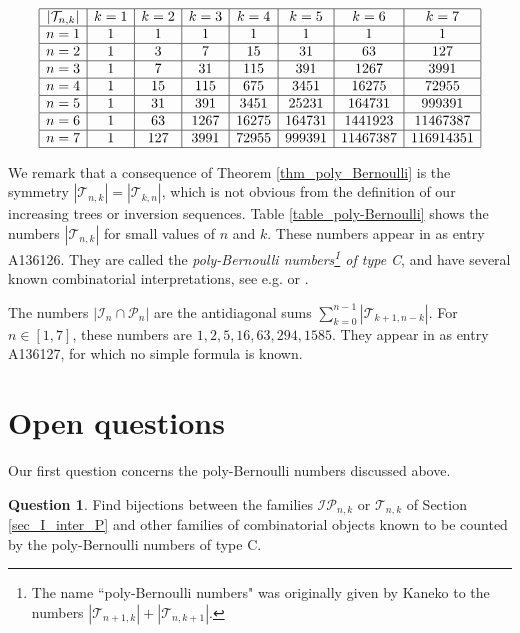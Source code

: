 \documentclass[a4paper,11pt]{article}
\theoremstyle{definition}
\newtheorem{question}{Question}
\theoremstyle{remark}
\newcommand{\I}{\mathcal{I}}
\renewcommand{\P}{\mathcal{P}}
\newcommand{\T}{\mathcal{T}}
\begin{document}
\begin{table}[ht]
$$\begin{array}{|c|c|c|c|c|c|c|c|}
\hline
|\T_{n,k}| & k=1 & k=2 & k=3 & k=4 & k=5 & k=6 & k=7 \\
\hline
n=1 & 1 & 1 & 1 & 1 & 1 & 1 & 1\\
\hline
n=2 & 1 & 3 & 7 & 15 & 31 & 63 & 127 \\
\hline
n=3 & 1 & 7 & 31 & 115 & 391 & 1267 & 3991 \\
\hline
n=4 & 1 & 15 & 115 & 675 & 3451 & 16275 & 72955 \\
\hline
n=5 & 1 & 31 & 391 & 3451 & 25231 & 164731 & 999391  \\
\hline
n=6 & 1 & 63 & 1267 & 16275 & 164731 & 1441923 & 11467387 \\
\hline
n=7 & 1 & 127 & 3991 & 72955 & 999391 & 11467387 & 116914351 \\
\hline
\end{array}$$
\caption{The numbers $|\T_{n,k}|$ for $n,k \in [1,7]$.}
\label{table_poly-Bernoulli}
\end{table}

We remark that a consequence of Theorem \ref{thm_poly_Bernoulli} is the symmetry $|\T_{n,k}| = |\T_{k,n}|$, which is not obvious from the definition of our increasing trees or inversion sequences.
Table \ref{table_poly-Bernoulli} shows the numbers $|\T_{n,k}|$ for small values of $n$ and $k$. These numbers appear in \cite{OEIS} as entry A136126. They are called the \emph{poly-Bernoulli numbers\footnote{The name ``poly-Bernoulli numbers" was originally given by Kaneko \cite{Kaneko_1997} to the numbers $|\T_{n+1,k}| + |\T_{n,k+1}|$.} of type C},
and have several known combinatorial interpretations, see e.g. \cite{Bényi_Hajnal_2017} or \cite{Knuth_2024}.

The numbers $|\I_n \cap \P_n|$ are the antidiagonal sums $\sum_{k = 0}^{n-1} |\T_{k+1,n-k}|$. For $n \in [1,7]$, these numbers are $1, 2, 5, 16, 63, 294, 1585$. They appear in \cite{OEIS} as entry A136127, for which no simple formula is known.

\section{Open questions} \label{sec_conclusion}

Our first question concerns the poly-Bernoulli numbers discussed above.
\begin{question}
    Find bijections between the families $\I\P_{n,k}$ or $\T_{n,k}$ of Section \ref{sec_I_inter_P} and other families of combinatorial objects known to be counted by the poly-Bernoulli numbers of type C.
\end{question}
\end{document}

